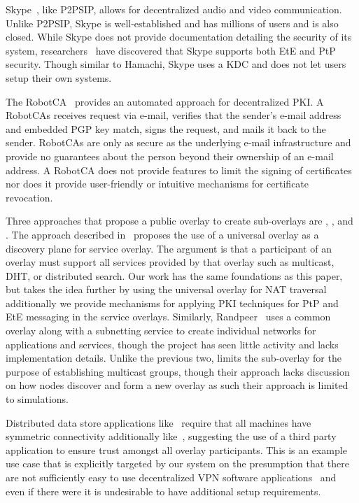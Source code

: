 \documentclass[conference]{IEEEtran}
\begin{document}
Skype~\cite{skype}, like P2PSIP, allows for decentralized audio and video
communication. Unlike P2PSIP, Skype is well-established and has millions
of users and is also closed.  While Skype does not provide documentation
detailing the security of its system, researchers~\cite{skype_auth,
skype_overview} have discovered that Skype supports both EtE and PtP security.
Though similar to Hamachi, Skype uses a KDC and does not let users setup their
own systems.

The RobotCA~\cite{robotca} provides an automated approach for decentralized
PKI.  A RobotCAs receives request via e-mail, verifies that the sender's e-mail
address and embedded PGP key match, signs the request, and mails it back to the
sender.  RobotCAs are only as secure as the underlying e-mail infrastructure
and provide no guarantees about the person beyond their ownership of an e-mail
address.  A RobotCA does not provide features to limit the signing of
certificates nor does it provide user-friendly or intuitive mechanisms for
certificate revocation.

Three approaches that propose a public overlay to create sub-overlays are
\cite{one_ring}, \cite{randpeer}, and \cite{can_multicast}.
The approach described in~\cite{one_ring} proposes the use of a universal
overlay as a discovery plane for
service overlay.  The argument is that a participant of an overlay
must support all services provided by that overlay such as multicast, DHT,
or distributed search.  Our work has the same foundations as this paper, but
takes the idea further by using the universal overlay for NAT traversal
additionally we provide mechanisms for applying PKI techniques for PtP and EtE
messaging in the service overlays.
Similarly, Randpeer~\cite{randpeer} uses a common overlay along with a
subnetting service to create individual networks for applications and services,
though the project has seen little activity and lacks implementation details.
Unlike the previous two, \cite{can_multicast} limits the sub-overlay for the
purpose of establishing multicast groups, though their approach lacks discussion
on how nodes discover and form a new overlay as such their approach is limited
to simulations.

Distributed data store applications like~\cite{dynamo, bigtable} require that
all machines have symmetric connectivity additionally like~\cite{past}, suggesting
the use of a third party application to ensure trust amongst all overlay
participants.  This is an example use case that is explicitly targeted by our
system on the presumption that there are not sufficiently easy to use
decentralized VPN software applications~\cite{sc09, nsdi10} and even if there
were it is undesirable to have additional setup requirements.
\end{document}
